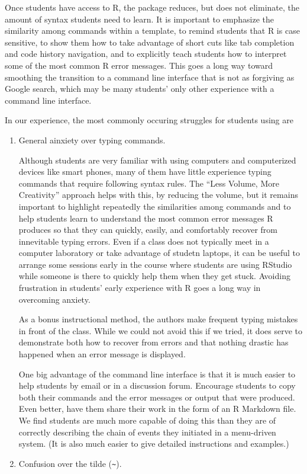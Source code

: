 Once students have access to R, the  package reduces, but
does not eliminate, the amount of syntax students need to learn. It is
important to emphasize the similarity among commands within a template,
to remind students that R is case sensitive, to show them how to take
advantage of short cuts like tab completion and code history navigation,
and to explicitly teach students how to interpret some of the most
common R error messages. This goes a long way toward smoothing the
transition to a command line interface that is not as forgiving as
Google search, which may be many students' only other experience with a
command line interface.

In our experience, the most commonly occuring struggles for students
using  are

\begin{enumerate}
\def\labelenumi{\arabic{enumi}.}
\item
  General ainxiety over typing commands.

  Although students are very familiar with using computers and
  computerized devices like smart phones, many of them have little
  experience typing commands that require following syntax rules. The
  ``Less Volume, More Creativity'' approach helps with this, by reducing
  the volume, but it remains important to highlight repeatedly the
  similarities among commands and to help students learn to understand
  the most common error messages R produces so that they can quickly,
  easily, and comfortably recover from innevitable typing errors. Even
  if a class does not typically meet in a computer laboratory or take
  advantage of studetn laptops, it can be useful to arrange some
  sessions early in the course where students are using RStudio while
  someone is there to quickly help them when they get stuck. Avoiding
  frustration in students' early experience with R goes a long way in
  overcoming anxiety.

  As a bonus instructional method, the authors make frequent typing
  mistakes in front of the class. While we could not avoid this if we
  tried, it does serve to demonstrate both how to recover from errors
  and that nothing drastic has happened when an error message is
  displayed.

  One big advantage of the command line interface is that it is much
  easier to help students by email or in a discussion forum. Encourage
  students to copy both their commands and the error messages or output
  that were produced. Even better, have them share their work in the
  form of an R Markdown file. We find students are much more capable of
  doing this than they are of correctly describing the chain of events
  they initiated in a menu-driven system. (It is also much easier to
  give detailed instructions and examples.)
\item
  Confusion over the tilde (\texttt{\textasciitilde{}}).


\end{enumerate}
